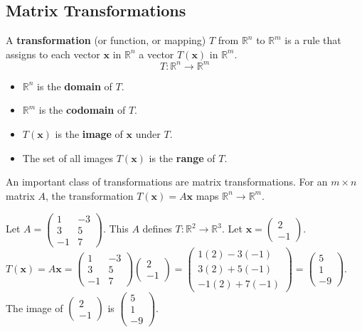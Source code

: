 \documentclass[oneside]{book}
\begin{document}
\subsection{Matrix Transformations}
A \textbf{transformation} (or function, or mapping) $T$ from $\mathbb{R}^n$ to $\mathbb{R}^m$ is a rule that assigns to each vector $\mathbf{x}$ in $\mathbb{R}^n$ a vector $T(\mathbf{x})$ in $\mathbb{R}^m$.
\[ T: \mathbb{R}^n \to \mathbb{R}^m \]
\begin{itemize}
    \item $\mathbb{R}^n$ is the \textbf{domain} of $T$.
    \item $\mathbb{R}^m$ is the \textbf{codomain} of $T$.
    \item $T(\mathbf{x})$ is the \textbf{image} of $\mathbf{x}$ under $T$.
    \item The set of all images $T(\mathbf{x})$ is the \textbf{range} of $T$.
\end{itemize}

An important class of transformations are matrix transformations.
For an $m \times n$ matrix $A$, the transformation $T(\mathbf{x}) = A\mathbf{x}$ maps $\mathbb{R}^n \to \mathbb{R}^m$.

\begin{example}
Let $A = \begin{pmatrix} 1 & -3 \\ 3 & 5 \\ -1 & 7 \end{pmatrix}$. This $A$ defines $T: \mathbb{R}^2 \to \mathbb{R}^3$.
Let $\mathbf{x} = \begin{pmatrix} 2 \\ -1 \end{pmatrix}$.
$T(\mathbf{x}) = A\mathbf{x} = \begin{pmatrix} 1 & -3 \\ 3 & 5 \\ -1 & 7 \end{pmatrix} \begin{pmatrix} 2 \\ -1 \end{pmatrix} = \begin{pmatrix} 1(2) - 3(-1) \\ 3(2) + 5(-1) \\ -1(2) + 7(-1) \end{pmatrix} = \begin{pmatrix} 5 \\ 1 \\ -9 \end{pmatrix}$.
The image of $\begin{pmatrix} 2 \\ -1 \end{pmatrix}$ is $\begin{pmatrix} 5 \\ 1 \\ -9 \end{pmatrix}$.
\end{example}
\end{document}
